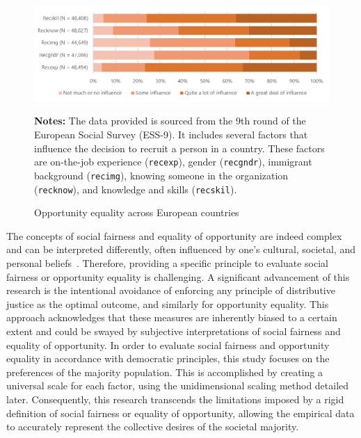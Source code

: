 \begin{figure}[h!]
	\centering
	\includegraphics[width=0.9\linewidth]{figs/fig3}
	\caption{Opportunity equality across European countries}
	\label{fig:fig3}
	\begin{minipage}{1\linewidth}
		\vspace{0.2cm}
		\footnotesize
		\textbf{Notes:}	The data provided is sourced from the 9th round of the European Social Survey (ESS-9). It includes several factors that influence the decision to recruit a person in a country. These factors are on-the-job experience (\texttt{recexp}), gender (\texttt{recgndr}), immigrant background (\texttt{recimg}), knowing someone in the organization (\texttt{recknow}), and knowledge and skills (\texttt{recskil}).	
	\end{minipage}
\end{figure}

The concepts of social fairness and equality of opportunity are indeed complex and can be interpreted differently, often influenced by one’s cultural, societal, and personal beliefs~\citep{trautmann2023procedural}. Therefore, providing a specific principle to evaluate social fairness or opportunity equality is challenging. A significant advancement of this research is the intentional avoidance of enforcing any principle of distributive justice as the optimal outcome, and similarly for opportunity equality. This approach acknowledges that these measures are inherently biased to a certain extent and could be swayed by subjective interpretations of social fairness and equality of opportunity. In order to evaluate social fairness and opportunity equality in accordance with democratic principles, this study focuses on the preferences of the majority population. This is accomplished by creating a universal scale for each factor, using the unidimensional scaling method detailed later. Consequently, this research transcends the limitations imposed by a rigid definition of social fairness or equality of opportunity, allowing the empirical data to accurately represent the collective desires of the societal majority.

